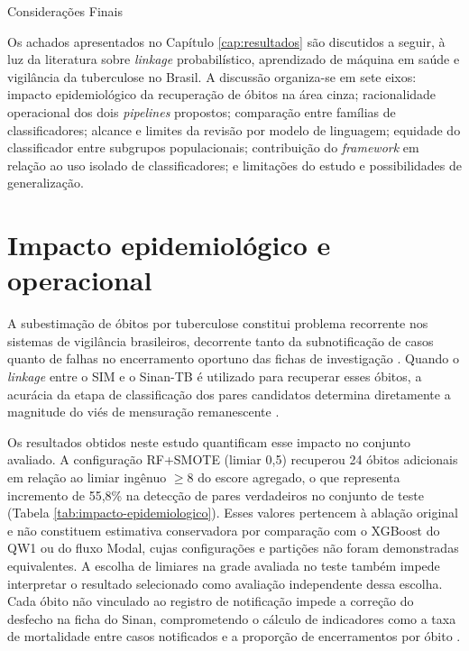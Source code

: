 \begin{chapter}{Considerações Finais}
\label{cap:discussao}

Os achados apresentados no Capítulo \ref{cap:resultados} são discutidos a seguir, à luz da literatura sobre \textit{linkage} probabilístico, aprendizado de máquina em saúde e vigilância da tuberculose no Brasil. A discussão organiza-se em sete eixos: impacto epidemiológico da recuperação de óbitos na área cinza; racionalidade operacional dos dois \textit{pipelines} propostos; comparação entre famílias de classificadores; alcance e limites da revisão por modelo de linguagem; equidade do classificador entre subgrupos populacionais; contribuição do \textit{framework} em relação ao uso isolado de classificadores; e limitações do estudo e possibilidades de generalização.

\section{Impacto epidemiológico e operacional}
\label{sec:cap6-impacto-epidemiologico}

A subestimação de óbitos por tuberculose constitui problema recorrente nos sistemas de vigilância brasileiros, decorrente tanto da subnotificação de casos quanto de falhas no encerramento oportuno das fichas de investigação \cite{Bartholomay2014improved, Santos2018underreporting}. Quando o \textit{linkage} entre o SIM e o Sinan-TB é utilizado para recuperar esses óbitos, a acurácia da etapa de classificação dos pares candidatos determina diretamente a magnitude do viés de mensuração remanescente \cite{Doidge2019linkageerror, Shaw2022biases}.

Os resultados obtidos neste estudo quantificam esse impacto no conjunto avaliado. A configuração RF+SMOTE (limiar 0,5) recuperou 24 óbitos adicionais em relação ao limiar ingênuo $\geq 8$ do escore agregado, o que representa incremento de 55,8\% na detecção de pares verdadeiros no conjunto de teste (Tabela \ref{tab:impacto-epidemiologico}). Esses valores pertencem à ablação original e não constituem estimativa conservadora por comparação com o XGBoost do QW1 ou do fluxo Modal, cujas configurações e partições não foram demonstradas equivalentes. A escolha de limiares na grade avaliada no teste também impede interpretar o resultado selecionado como avaliação independente dessa escolha. Cada óbito não vinculado ao registro de notificação impede a correção do desfecho na ficha do Sinan, comprometendo o cálculo de indicadores como a taxa de mortalidade entre casos notificados e a proporção de encerramentos por óbito \cite{Lima2020tbquality, Oliveira2019early}.


\end{chapter}
